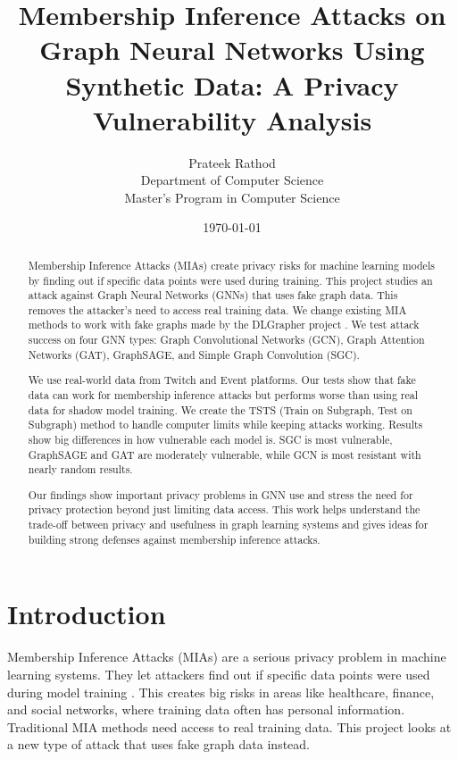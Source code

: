 \documentclass{article}
\title{Membership Inference Attacks on Graph Neural Networks Using Synthetic Data: A Privacy Vulnerability Analysis}
\author{Prateek Rathod\\
Department of Computer Science\\
Master's Program in Computer Science}
\date{\today}
\begin{document}
\maketitle

\begin{abstract}
Membership Inference Attacks (MIAs) create privacy risks for machine learning models by finding out if specific data points were used during training. This project studies an attack against Graph Neural Networks (GNNs) that uses fake graph data. This removes the attacker's need to access real training data. We change existing MIA methods to work with fake graphs made by the DLGrapher project \cite{dlgrapher2022}. We test attack success on four GNN types: Graph Convolutional Networks (GCN), Graph Attention Networks (GAT), GraphSAGE, and Simple Graph Convolution (SGC). 

We use real-world data from Twitch and Event platforms. Our tests show that fake data can work for membership inference attacks but performs worse than using real data for shadow model training. We create the TSTS (Train on Subgraph, Test on Subgraph) method to handle computer limits while keeping attacks working. Results show big differences in how vulnerable each model is. SGC is most vulnerable, GraphSAGE and GAT are moderately vulnerable, while GCN is most resistant with nearly random results. 

Our findings show important privacy problems in GNN use and stress the need for privacy protection beyond just limiting data access. This work helps understand the trade-off between privacy and usefulness in graph learning systems and gives ideas for building strong defenses against membership inference attacks.
\end{abstract}

\tableofcontents
\newpage

\section{Introduction}
Membership Inference Attacks (MIAs) are a serious privacy problem in machine learning systems. They let attackers find out if specific data points were used during model training \cite{shokri2017membership}. This creates big risks in areas like healthcare, finance, and social networks, where training data often has personal information. Traditional MIA methods need access to real training data. This project looks at a new type of attack that uses fake graph data instead.
\end{document}
